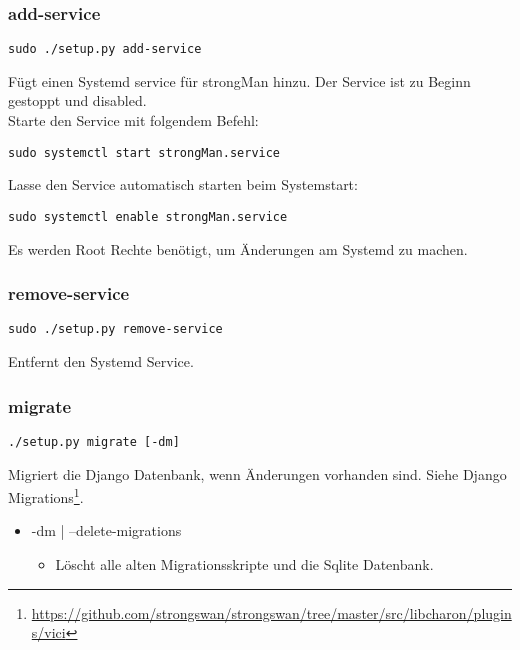 \subsubsection{add-service}
\begin{lstlisting}[style=BashInputStyle]
	 sudo ./setup.py add-service
\end{lstlisting}
Fügt einen Systemd service für strongMan hinzu. Der Service ist zu Beginn gestoppt und disabled.\\

Starte den Service mit folgendem Befehl:
\begin{lstlisting}[style=BashInputStyle]
	 sudo systemctl start strongMan.service
\end{lstlisting}

Lasse den Service automatisch starten beim Systemstart:
\begin{lstlisting}[style=BashInputStyle]
	 sudo systemctl enable strongMan.service
\end{lstlisting}
Es werden Root Rechte benötigt, um Änderungen am Systemd zu machen.

\subsubsection{remove-service}
\begin{lstlisting}[style=BashInputStyle]
	 sudo ./setup.py remove-service
\end{lstlisting}
Entfernt den Systemd Service.

\subsubsection{migrate}
\begin{lstlisting}[style=BashInputStyle]
	 ./setup.py migrate [-dm]
\end{lstlisting}
Migriert die Django Datenbank, wenn Änderungen vorhanden sind. Siehe Django Migrations\footnote{\url{https://github.com/strongswan/strongswan/tree/master/src/libcharon/plugins/vici}}.
\begin{itemize}
	\item -dm | --delete-migrations
	\begin{itemize}
	    \item Löscht alle alten Migrationsskripte und die Sqlite Datenbank.
	\end{itemize}
\end{itemize}